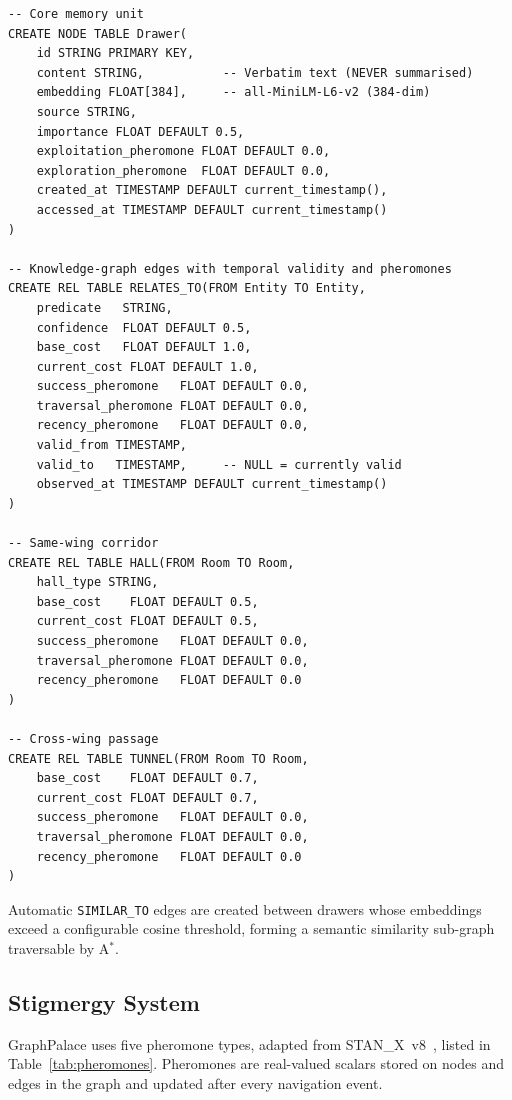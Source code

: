 \documentclass[11pt,a4paper]{article}
\begin{document}
\begin{lstlisting}[language=Cypher, caption={Selected Cypher DDL for palace node and edge types.}, label={lst:cypher_schema}]
-- Core memory unit
CREATE NODE TABLE Drawer(
    id STRING PRIMARY KEY,
    content STRING,           -- Verbatim text (NEVER summarised)
    embedding FLOAT[384],     -- all-MiniLM-L6-v2 (384-dim)
    source STRING,
    importance FLOAT DEFAULT 0.5,
    exploitation_pheromone FLOAT DEFAULT 0.0,
    exploration_pheromone  FLOAT DEFAULT 0.0,
    created_at TIMESTAMP DEFAULT current_timestamp(),
    accessed_at TIMESTAMP DEFAULT current_timestamp()
)

-- Knowledge-graph edges with temporal validity and pheromones
CREATE REL TABLE RELATES_TO(FROM Entity TO Entity,
    predicate   STRING,
    confidence  FLOAT DEFAULT 0.5,
    base_cost   FLOAT DEFAULT 1.0,
    current_cost FLOAT DEFAULT 1.0,
    success_pheromone   FLOAT DEFAULT 0.0,
    traversal_pheromone FLOAT DEFAULT 0.0,
    recency_pheromone   FLOAT DEFAULT 0.0,
    valid_from TIMESTAMP,
    valid_to   TIMESTAMP,     -- NULL = currently valid
    observed_at TIMESTAMP DEFAULT current_timestamp()
)

-- Same-wing corridor
CREATE REL TABLE HALL(FROM Room TO Room,
    hall_type STRING,
    base_cost    FLOAT DEFAULT 0.5,
    current_cost FLOAT DEFAULT 0.5,
    success_pheromone   FLOAT DEFAULT 0.0,
    traversal_pheromone FLOAT DEFAULT 0.0,
    recency_pheromone   FLOAT DEFAULT 0.0
)

-- Cross-wing passage
CREATE REL TABLE TUNNEL(FROM Room TO Room,
    base_cost    FLOAT DEFAULT 0.7,
    current_cost FLOAT DEFAULT 0.7,
    success_pheromone   FLOAT DEFAULT 0.0,
    traversal_pheromone FLOAT DEFAULT 0.0,
    recency_pheromone   FLOAT DEFAULT 0.0
)
\end{lstlisting}

Automatic \texttt{SIMILAR\_TO} edges are created between drawers whose
embeddings exceed a configurable cosine threshold, forming a semantic
similarity sub-graph traversable by A$^*$.

\subsection{Stigmergy System}
\label{sec:stigmergy}

GraphPalace uses five pheromone types, adapted from STAN\_X~v8~\cite{stanx2026},
listed in Table~\ref{tab:pheromones}.  Pheromones are real-valued scalars stored
on nodes and edges in the graph and updated after every navigation event.
\end{document}
